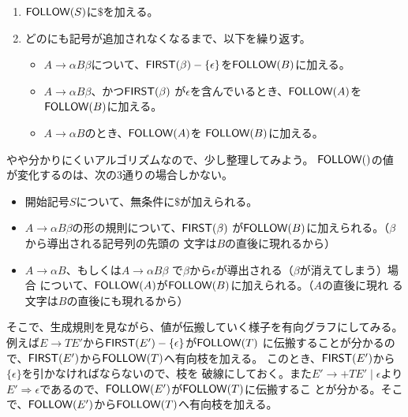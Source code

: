 \begin{enumerate}
 \item ${\sf FOLLOW}(S)$に$\$$を加える。
 \item どの\Follow にも記号が追加されなくなるまで、以下を繰り返す。
       \begin{itemize}
	\item $A \rightarrow \alpha B\beta$について、${\sf FIRST}(\beta)
	      - \{\epsilon\}$を${\sf FOLLOW}(B)$に加える。
	\item $A \rightarrow \alpha B\beta$、かつ${\sf FIRST}(\beta)$
	      が$\epsilon$を含んでいるとき、${\sf FOLLOW}(A)$を
	      ${\sf FOLLOW}(B)$に加える。
	\item $A \rightarrow \alpha B$のとき、${\sf FOLLOW}(A)$を
	      ${\sf FOLLOW}(B)$に加える。
       \end{itemize}
\end{enumerate}

やや分かりにくいアルゴリズムなので、少し整理してみよう。
${\sf FOLLOW}()$の値が変化するのは、次の3通りの場合しかない。
\begin{itemize}
 \item 開始記号$S$について、無条件に$\$$が加えられる。
 \item $A \rightarrow \alpha B \beta$の形の規則について、${\sf FIRST}(\beta)$
       が${\sf FOLLOW}(B)$に加えられる。（$\beta$から導出される記号列の先頭の
       文字は$B$の直後に現れるから）
 \item $A \rightarrow \alpha B$、もしくは$A \rightarrow \alpha B \beta$
       で$\beta$から$\epsilon$が導出される（$\beta$が消えてしまう）場合
       について、${\sf FOLLOW}(A)$が${\sf FOLLOW}(B)$に加えられる。（$A$の直後に現れ
       る文字は$B$の直後にも現れるから）
\end{itemize}
そこで、生成規則を見ながら、値が伝搬していく様子を有向グラフにしてみる。
例えば$E \rightarrow TE'$から${\sf FIRST}(E') - \{\epsilon\}$が${\sf FOLLOW}(T)$
に伝搬することが分かるので、${\sf FIRST}(E')$から${\sf FOLLOW}(T)$へ有向枝を加える。
このとき、${\sf FIRST}(E')$から$\{\epsilon\}$を引かなければならないので、枝を
破線にしておく。また$E' \rightarrow +TE' \mid \epsilon$より$E'
\Rightarrow \epsilon$であるので、${\sf FOLLOW}(E')$が${\sf FOLLOW}(T)$に伝搬するこ
とが分かる。そこで、${\sf FOLLOW}(E')$から${\sf FOLLOW}(T)$へ有向枝を加える。

